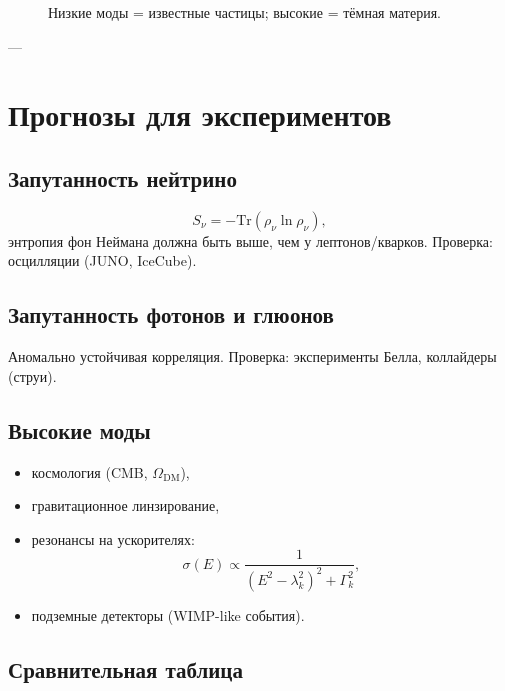 \documentclass[12pt,a4paper]{article}
\begin{document}
\begin{figure}[h!]
\centering
{}
\caption{Низкие моды = известные частицы; высокие = тёмная материя.}
\end{figure}

---

\section{Прогнозы для экспериментов}
\subsection{Запутанность нейтрино}
\[
S_\nu = - \mathrm{Tr}(\rho_\nu \ln \rho_\nu),
\]
энтропия фон Неймана должна быть выше, чем у лептонов/кварков.  
Проверка: осцилляции (JUNO, IceCube).  

\subsection{Запутанность фотонов и глюонов}
Аномально устойчивая корреляция. Проверка: эксперименты Белла, коллайдеры (струи).  

\subsection{Высокие моды}
\begin{itemize}
  \item космология (CMB, $\Omega_{\mathrm{DM}}$),
  \item гравитационное линзирование,
  \item резонансы на ускорителях:
  \[
  \sigma(E) \propto \frac{1}{(E^2 - \lambda_k^2)^2 + \Gamma_k^2},
  \]
  \item подземные детекторы (WIMP-like события).
\end{itemize}

\subsection{Сравнительная таблица}
\end{document}
